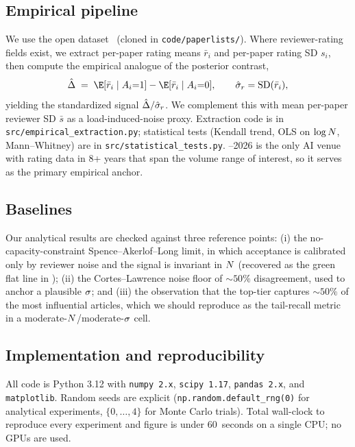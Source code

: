 \subsection{Empirical pipeline}
\label{sec:method-empirical}

We use the open \papercopilot dataset~\citep{yang2025papercopilot} (cloned in \texttt{code/paperlists/}). Where reviewer-rating fields exist, we extract per-paper rating means $\bar r_i$ and per-paper rating SD $s_i$, then compute the empirical analogue of the posterior contrast,
\begin{equation}
    \hcontrast \;=\; \E[\bar r_i \mid \acc_i{=}1] - \E[\bar r_i \mid \acc_i{=}0], \qquad \stdrating = \mathrm{SD}(\bar r_i),
\end{equation}
yielding the standardized signal $\hat{\Delta} / \hat{\sigma}_r$. We complement this with mean per-paper reviewer SD $\bar s$ as a load-induced-noise proxy. Extraction code is in \texttt{src/empirical\_extraction.py}; statistical tests (Kendall trend, OLS on $\log N$, Mann--Whitney) are in \texttt{src/statistical\_tests.py}. --2026 is the only AI venue with rating data in $8$+ years that span the volume range of interest, so it serves as the primary empirical anchor.

\subsection{Baselines}
\label{sec:method-baselines}

Our analytical results are checked against three reference points: (i) the no-capacity-constraint Spence--Akerlof--Long limit, in which acceptance is calibrated only by reviewer noise and the signal is invariant in $N$ (recovered as the green flat line in ); (ii) the Cortes--Lawrence  noise floor of $\sim 50\%$ disagreement, used to anchor a plausible $\sigma$; and (iii) the \citet{heckman2019tyranny} observation that the top-tier captures $\sim 50\%$ of the most influential articles, which we should reproduce as the tail-recall metric in a moderate-$N$/moderate-$\sigma$ cell.

\subsection{Implementation and reproducibility}

All code is Python 3.12 with \texttt{numpy 2.x}, \texttt{scipy 1.17}, \texttt{pandas 2.x}, and \texttt{matplotlib}. Random seeds are explicit (\texttt{np.random.default\_rng(0)} for analytical experiments, $\{0,\dots,4\}$ for Monte Carlo trials). Total wall-clock to reproduce every experiment and figure is under $60$~seconds on a single CPU; no GPUs are used.
